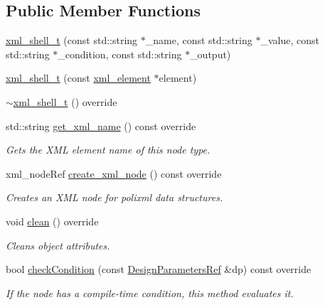 \subsection*{Public Member Functions}
\begin{DoxyCompactItemize}
\item 
\hyperlink{classxml__shell__t_ac761bcf9dc05b760bc95839f856491d7}{xml\+\_\+shell\+\_\+t} (const std\+::string $\ast$\+\_\+name, const std\+::string $\ast$\+\_\+value, const std\+::string $\ast$\+\_\+condition, const std\+::string $\ast$\+\_\+output)
\item 
\hyperlink{classxml__shell__t_a583480ddfa2a59cd5e623106b48b7d4c}{xml\+\_\+shell\+\_\+t} (const \hyperlink{classxml__element}{xml\+\_\+element} $\ast$element)
\item 
\hyperlink{classxml__shell__t_aa6e37116b91269a26f1e9c2f0397752a}{$\sim$xml\+\_\+shell\+\_\+t} () override
\item 
std\+::string \hyperlink{classxml__shell__t_a5a9787981f0f16d4182a21cca3b14916}{get\+\_\+xml\+\_\+name} () const override
\begin{DoxyCompactList}\small\item\em Gets the X\+ML element name of this node type. \end{DoxyCompactList}\item 
xml\+\_\+node\+Ref \hyperlink{classxml__shell__t_a8e65fb9948e3fdc63e370de8c67cfefc}{create\+\_\+xml\+\_\+node} () const override
\begin{DoxyCompactList}\small\item\em Creates an X\+ML node for polixml data structures. \end{DoxyCompactList}\item 
void \hyperlink{classxml__shell__t_a372d74254457c1e1a7f2ffa093d25397}{clean} () override
\begin{DoxyCompactList}\small\item\em Cleans object attributes. \end{DoxyCompactList}\item 
bool \hyperlink{classxml__shell__t_aa23d475623b5aafbbbe919a2f23e400c}{check\+Condition} (const \hyperlink{DesignParameters_8hpp_ae36bb1c4c9150d0eeecfe1f96f42d157}{Design\+Parameters\+Ref} \&dp) const override
\begin{DoxyCompactList}\small\item\em If the node has a compile-\/time condition, this method evaluates it. \end{DoxyCompactList}\end{DoxyCompactItemize}
